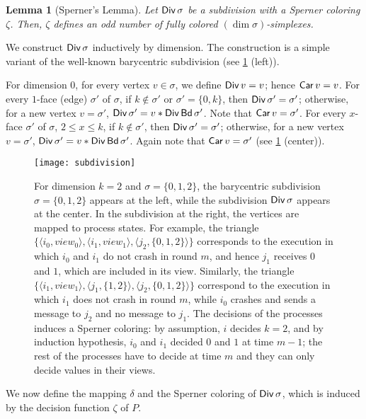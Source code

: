 \documentclass[11pt]{article}
\newtheorem{lemma}{Lemma}
\theoremstyle{definition}
\newcommand{\set}[1]{\{#1\}}
\DeclareMathOperator{\Car}{\sf Car}
\DeclareMathOperator{\Div}{\sf Div}
\DeclareMathOperator{\bdry}{\sf Bd}
\newcommand{\ang}[1]{\langle{#1}\rangle}
\begin{document}
\begin{lemma}[Sperner's Lemma]
Let $\Div \sigma$ be a subdivision with a Sperner coloring $\zeta$.
Then, $\zeta$ defines an odd number of fully colored $(\dim \sigma)$-simplexes.
\end{lemma}

We construct $\Div \sigma$ inductively by dimension.
The construction is a simple variant of the well-known barycentric subdivision
(see \cref{fig-subdivision} (left)).

For dimension $0$, for every vertex $v \in \sigma$, we define $\Div v = v$;
hence $\Car v = v$.
For every $1$-face (edge) $\sigma'$ of $\sigma$,
if $k \notin \sigma'$ or $\sigma' = \{0, k\}$, then $\Div \sigma' = \sigma'$;
otherwise, for a new vertex $v = \sigma'$,
$\Div \sigma' = v \ast \Div \bdry \sigma'$.
Note that $\Car v = \sigma'$.
For every $x$-face $\sigma'$ of $\sigma$, $2 \leq x \leq k$,
if $k \notin \sigma'$, then $\Div \sigma' = \sigma'$;
otherwise, for a new vertex $v = \sigma'$,
$\Div \sigma' = v \ast \Div \bdry \sigma'$.
Again note that $\Car v = \sigma'$
(see \cref{fig-subdivision} (center)).

\begin{figure}[t]
\centering
        \texttt{[image: subdivision]}
        \caption{\footnotesize
        For dimension $k=2$ and $\sigma = \set{0,1,2}$,
        the barycentric subdivision $\sigma = \set{0,1,2}$ appears at the left,
		while the subdivision $\Div \sigma$ appears at the center.
        In the subdivision at the right, the vertices are mapped to process states.
        For example, the triangle $\set{\ang{i_0,view_0}, \ang{i_1, view_1}, \ang{j_2, \set{0,1,2}}}$ corresponds
        to the execution in which $i_0$ and $i_1$ do not crash in round $m$, and hence
        $j_1$ receives $0$ and $1$, which are included in its view.
   		Similarly, the triangle $\set{\ang{i_1, view_1}, \ang{j_1, \set{1,2}}, \ang{j_2, \set{0,1,2}}}$
   		correspond to the execution in which $i_1$ does not crash in round $m$,
   		while $i_0$ crashes and sends a message to $j_2$ and no message to $j_1$.
        The decisions of the processes induces a Sperner coloring:
        by assumption, $i$ decides $k=2$, and by induction hypothesis,
        $i_0$ and $i_1$ decided $0$ and $1$ at time $m-1$;
        the rest of the processes have to decide at time $m$ and
        they can only decide values in their views.
        }
		\label{fig-subdivision}
\end{figure}

We now define the mapping $\delta$ and the Sperner coloring of $\Div \sigma$,
which is induced by the decision function $\zeta$ of $P$.
\end{document}
